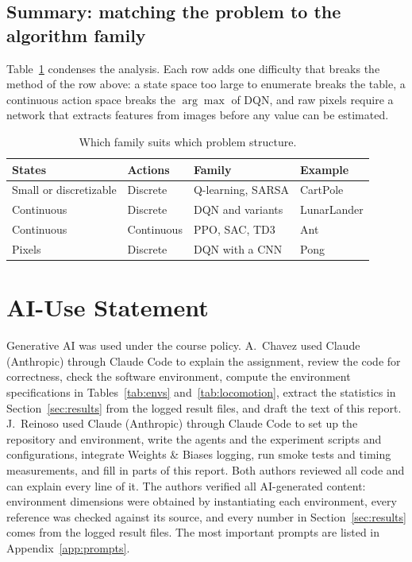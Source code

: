 \documentclass[conference]{IEEEtran}
\begin{document}
\subsection{Summary: matching the problem to the algorithm family}
Table~\ref{tab:families} condenses the analysis. Each row adds one difficulty that breaks
the method of the row above: a state space too large to enumerate breaks the table, a
continuous action space breaks the $\arg\max$ of DQN, and raw pixels require a network
that extracts features from images before any value can be estimated.

\begin{table}[t]
\centering
\caption{Which family suits which problem structure.}
\label{tab:families}
\footnotesize
\setlength{\tabcolsep}{3pt}
\begin{tabular}{@{}llll@{}}
\toprule
States & Actions & Family & Example \\
\midrule
Small or discretizable & Discrete   & Q-learning, SARSA & CartPole \\
Continuous             & Discrete   & DQN and variants  & LunarLander \\
Continuous             & Continuous & PPO, SAC, TD3     & Ant \\
Pixels                 & Discrete   & DQN with a CNN    & Pong \\
\bottomrule
\end{tabular}
\end{table}

\section{AI-Use Statement}
Generative AI was used under the course policy. A.~Chavez used Claude (Anthropic) through
Claude Code to explain the assignment, review the code for correctness, check the software
environment, compute the environment specifications in Tables~\ref{tab:envs}
and~\ref{tab:locomotion}, extract the statistics in Section~\ref{sec:results} from the
logged result files, and draft the text of this report. J.~Reinoso used Claude (Anthropic)
through Claude Code to set up the repository and environment, write the agents and the
experiment scripts and configurations, integrate Weights \& Biases logging, run smoke
tests and timing measurements, and fill in parts of this report. Both authors reviewed
all code and can explain every line of it. The authors verified all
AI-generated content: environment dimensions were obtained by instantiating each
environment, every reference was checked against its source,
and every number in Section~\ref{sec:results} comes from the logged result files. The most
important prompts are listed in Appendix~\ref{app:prompts}.
\end{document}
